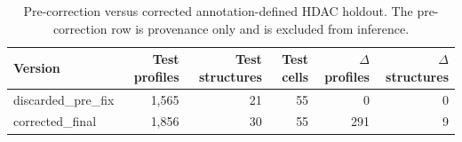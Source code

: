 \begingroup
\small
\begin{table}[H]
\centering
\caption{Pre-correction versus corrected annotation-defined HDAC holdout. The pre-correction row is provenance only and is excluded from inference.}
\label{tab:s_prepost}
\begin{tabular}{@{}lrrrrr@{}}
\toprule
Version & Test profiles & Test structures & Test cells & $\Delta$ profiles & $\Delta$ structures \\
\midrule
discarded\_pre\_fix & 1,565 & 21 & 55 & 0 & 0 \\
corrected\_final & 1,856 & 30 & 55 & 291 & 9 \\
\bottomrule
\end{tabular}
\end{table}
\endgroup
